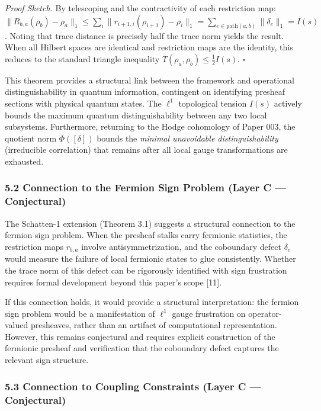 \documentclass[
]{article}
\begin{document}
\emph{Proof Sketch.} By telescoping and the contractivity of each
restriction map:
\(\|R_{b,a}(\rho_b) - \rho_a\|_1 \le \sum_{i} \|r_{i+1,i}(\rho_{i+1}) - \rho_i\|_1 = \sum_{e \in \text{path}(a,b)} \|\delta_e\|_1 = I(s)\).
Noting that trace distance is precisely half the trace norm yields the
result. When all Hilbert spaces are identical and restriction maps are
the identity, this reduces to the standard triangle inequality
\(T(\rho_a, \rho_b) \le \frac{1}{2} I(s)\). \(\square\)

This theorem provides a structural link between the framework and
operational distinguishability in quantum information, contingent on
identifying presheaf sections with physical quantum states. The
\(\ell^1\) topological tension \(I(s)\) actively bounds the maximum
quantum distinguishability between any two local subsystems.
Furthermore, returning to the Hodge cohomology of Paper 003, the
quotient norm \(\Phi([\delta])\) bounds the \emph{minimal unavoidable
distinguishability} (irreducible correlation) that remains after all
local gauge transformations are exhausted.

\subsubsection{5.2 Connection to the Fermion Sign Problem (Layer C ---
Conjectural)}\label{connection-to-the-fermion-sign-problem-layer-c-conjectural}

The Schatten-1 extension (Theorem 3.1) suggests a structural connection
to the fermion sign problem. When the presheaf stalks carry fermionic
statistics, the restriction maps \(r_{b,a}\) involve antisymmetrization,
and the coboundary defect \(\delta_e\) would measure the failure of
local fermionic states to glue consistently. Whether the trace norm of
this defect can be rigorously identified with sign frustration requires
formal development beyond this paper's scope {[}11{]}.

If this connection holds, it would provide a structural interpretation:
the fermion sign problem would be a manifestation of \(\ell^1\) gauge
frustration on operator-valued presheaves, rather than an artifact of
computational representation. However, this remains conjectural and
requires explicit construction of the fermionic presheaf and
verification that the coboundary defect captures the relevant sign
structure.

\subsubsection{5.3 Connection to Coupling Constraints (Layer C ---
Conjectural)}\label{connection-to-coupling-constraints-layer-c-conjectural}
\end{document}
